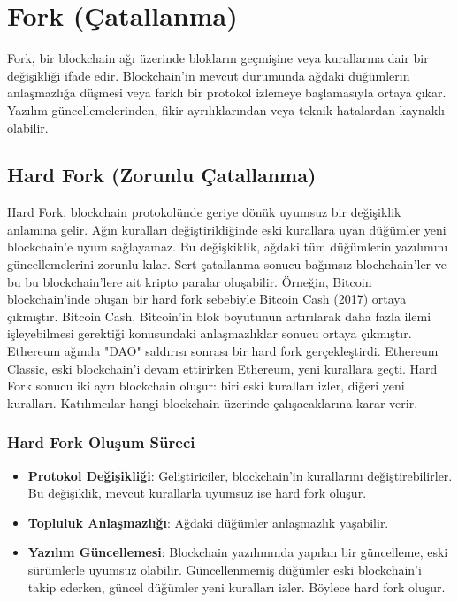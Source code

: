 \section{Fork (Çatallanma)}

Fork, bir blockchain ağı üzerinde blokların geçmişine veya kurallarına dair bir değişikliği ifade edir. Blockchain'in mevcut durumunda ağdaki düğümlerin anlaşmazlığa düşmesi veya farklı bir protokol izlemeye başlamasıyla ortaya çıkar. Yazılım güncellemelerinden, fikir ayrılıklarından veya teknik hatalardan kaynaklı olabilir.

\subsection{Hard Fork (Zorunlu Çatallanma)}

Hard Fork, blockchain protokolünde geriye dönük uyumsuz bir değişiklik anlamına gelir. Ağın kuralları değiştirildiğinde eski kurallara uyan düğümler yeni blockchain'e uyum sağlayamaz. Bu değişkiklik, ağdaki tüm düğümlerin yazılımını güncellemelerini zorunlu kılar. Sert çatallanma sonucu bağımsız blochchain'ler ve bu bu blockchain'lere ait kripto paralar oluşabilir. Örneğin, Bitcoin blockchain'inde oluşan bir hard fork sebebiyle Bitcoin Cash (2017) ortaya çıkmıştır. Bitcoin Cash, Bitcoin'in blok boyutunun artırılarak daha fazla ilemi işleyebilmesi gerektiği konusundaki anlaşmazlıklar sonucu ortaya çıkmıştır. Ethereum ağında "DAO" saldırısı sonrası bir hard fork gerçekleştirdi. Ethereum Classic, eski blockchain’i devam ettirirken Ethereum, yeni kurallara geçti. Hard Fork sonucu iki ayrı blockchain oluşur: biri eski kuralları izler, diğeri yeni kuralları. Katılımcılar hangi blockchain üzerinde çalışacaklarına karar verir.

\subsubsection{Hard Fork Oluşum Süreci}

\begin{itemize}
    \item \textbf{Protokol Değişikliği}: Geliştiriciler, blockchain'in kurallarını değiştirebilirler. Bu değişiklik, mevcut kurallarla uyumsuz ise hard fork oluşur.
    \item \textbf{Topluluk Anlaşmazlığı}: Ağdaki düğümler anlaşmazlık yaşabilir.
    \item \textbf{Yazılım Güncellemesi}: Blockchain yazılımında yapılan bir güncelleme, eski sürümlerle uyumsuz olabilir. Güncellenmemiş düğümler eski blockchain'i takip ederken, güncel düğümler yeni kuralları izler. Böylece hard fork oluşur.
\end{itemize}

